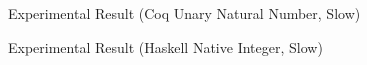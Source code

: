 \begin{figure}[!htb]
        \caption{\label{fig:straightslowu} Experimental Result (Coq Unary Natural Number, Slow)}
      \end{figure}
      
      
\begin{figure}[!htb]
        \caption{\label{fig:straightslown} Experimental Result (Haskell Native Integer, Slow)}
\end{figure}
%      



